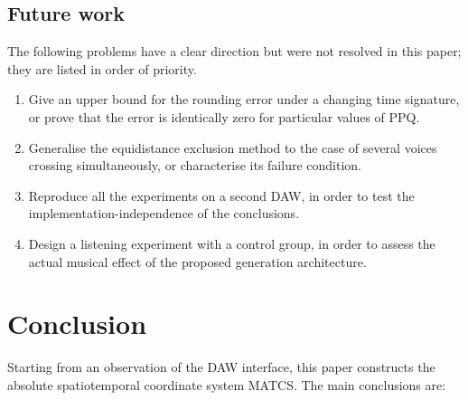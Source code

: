 \documentclass[11pt,a4paper]{article}
\begin{document}
\subsection{Future work}

The following problems have a clear direction but were not resolved in this paper; they
are listed in order of priority.

\begin{enumerate}[leftmargin=2.2em,itemsep=0.15em,topsep=0.2em]
  \item Give an upper bound for the rounding error under a changing time signature, or
        prove that the error is identically zero for particular values of PPQ.
  \item Generalise the equidistance exclusion method to the case of several voices
        crossing simultaneously, or characterise its failure condition.
  \item Reproduce all the experiments on a second DAW, in order to test the
        implementation-independence of the conclusions.
  \item Design a listening experiment with a control group, in order to assess the
        actual musical effect of the proposed generation architecture.
\end{enumerate}

\section{Conclusion}
Starting from an observation of the DAW interface, this paper constructs the absolute
spatiotemporal coordinate system MATCS. The main conclusions are:
\end{document}
